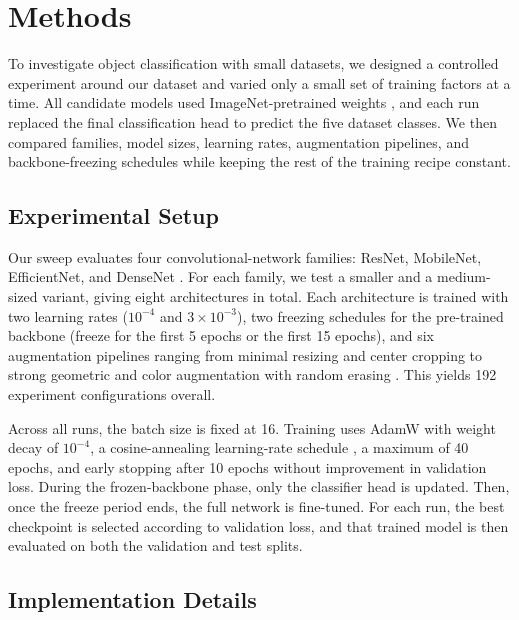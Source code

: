 \documentclass[conference]{IEEEtran}
\begin{document}
\section{Methods}

To investigate object classification with small datasets, we designed a controlled experiment around our dataset and varied only a small set of training factors at a time. All candidate models used ImageNet-pretrained weights \cite{deng2009imagenet}, and each run replaced the final classification head to predict the five dataset classes. We then compared families, model sizes, learning rates, augmentation pipelines, and backbone-freezing schedules while keeping the rest of the training recipe constant.

\subsection{Experimental Setup}

Our sweep evaluates four convolutional-network families: ResNet, MobileNet, EfficientNet, and DenseNet \cite{he2016resnet, howard2017mobilenets, tan2019efficientnet}. For each family, we test a smaller and a medium-sized variant, giving eight architectures in total. Each architecture is trained with two learning rates ($10^{-4}$ and $3 \times 10^{-3}$), two freezing schedules for the pre-trained backbone (freeze for the first 5 epochs or the first 15 epochs), and six augmentation pipelines ranging from minimal resizing and center cropping to strong geometric and color augmentation with random erasing \cite{shorten2019augmentation}. This yields 192 experiment configurations overall.

Across all runs, the batch size is fixed at 16. Training uses AdamW \cite{loshchilov2019adamw} with weight decay of $10^{-4}$, a cosine-annealing learning-rate schedule \cite{loshchilov2017sgdr}, a maximum of 40 epochs, and early stopping after 10 epochs without improvement in validation loss. During the frozen-backbone phase, only the classifier head is updated. Then, once the freeze period ends, the full network is fine-tuned. For each run, the best checkpoint is selected according to validation loss, and that trained model is then evaluated on both the validation and test splits.

\subsection{Implementation Details}
\end{document}
